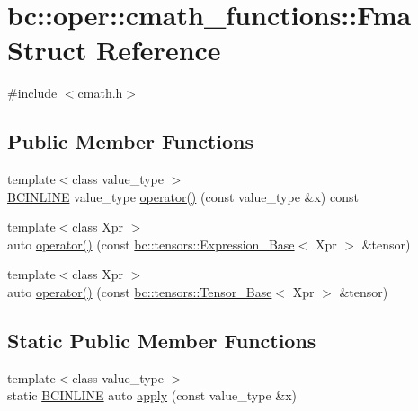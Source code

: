 \hypertarget{structbc_1_1oper_1_1cmath__functions_1_1Fma}{}\section{bc\+:\+:oper\+:\+:cmath\+\_\+functions\+:\+:Fma Struct Reference}
\label{structbc_1_1oper_1_1cmath__functions_1_1Fma}


{\ttfamily \#include $<$cmath.\+h$>$}

\subsection*{Public Member Functions}
\begin{DoxyCompactItemize}
\item 
{\footnotesize template$<$class value\+\_\+type $>$ }\\\hyperlink{common_8h_a6699e8b0449da5c0fafb878e59c1d4b1}{B\+C\+I\+N\+L\+I\+NE} value\+\_\+type \hyperlink{structbc_1_1oper_1_1cmath__functions_1_1Fma_a827d850bf5eecfbb901ba1e9722b1b18}{operator()} (const value\+\_\+type \&x) const
\item 
{\footnotesize template$<$class Xpr $>$ }\\auto \hyperlink{structbc_1_1oper_1_1cmath__functions_1_1Fma_ad542c1c3cdbeee19a82cc58768dafb51}{operator()} (const \hyperlink{classbc_1_1tensors_1_1Expression__Base}{bc\+::tensors\+::\+Expression\+\_\+\+Base}$<$ Xpr $>$ \&tensor)
\item 
{\footnotesize template$<$class Xpr $>$ }\\auto \hyperlink{structbc_1_1oper_1_1cmath__functions_1_1Fma_a24c07a2d716c633a7ef22ac804d806fd}{operator()} (const \hyperlink{classbc_1_1tensors_1_1Tensor__Base}{bc\+::tensors\+::\+Tensor\+\_\+\+Base}$<$ Xpr $>$ \&tensor)
\end{DoxyCompactItemize}
\subsection*{Static Public Member Functions}
\begin{DoxyCompactItemize}
\item 
{\footnotesize template$<$class value\+\_\+type $>$ }\\static \hyperlink{common_8h_a6699e8b0449da5c0fafb878e59c1d4b1}{B\+C\+I\+N\+L\+I\+NE} auto \hyperlink{structbc_1_1oper_1_1cmath__functions_1_1Fma_aa1cd252de7fcdcc34a5f915522562711}{apply} (const value\+\_\+type \&x)
\end{DoxyCompactItemize}


